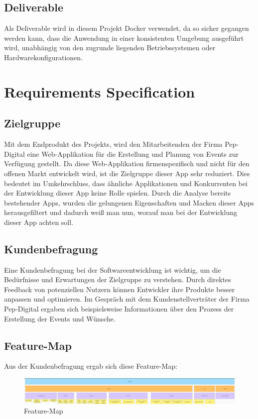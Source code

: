 \documentclass[a4paper,12pt]{article}
\begin{document}
\subsection{Deliverable}
Als Deliverable wird in diesem Projekt Docker verwendet, da so sicher gegangen werden kann, dass die Anwendung in einer konsistenten Umgebung ausgeführt wird, unabhängig von den zugrunde liegenden Betriebssystemen oder Hardwarekonfigurationen.
\newpage
\section{Requirements Specification}
\subsection{Zielgruppe}
Mit dem Endprodukt des Projekts, wird den Mitarbeitenden der Firma Pep-Digital eine Web-Applikation für die Erstellung und Planung von Events zur Verfügung gestellt. Da diese Web-Applikation firmenspezifisch und  nicht für den offenen Markt entwickelt wird, ist die Zielgruppe dieser App sehr reduziert. Dies bedeutet im Umkehrschluss, dass ähnliche Applikationen und Konkurrenten bei der Entwicklung dieser App keine Rolle spielen. Durch die Analyse bereits bestehender Apps, wurden die gelungenen Eigenschaften und Macken dieser Apps herausgefiltert und dadurch weiß man nun, worauf man bei der Entwicklung dieser App achten soll.
\subsection{Kundenbefragung}
Eine Kundenbefragung bei der Softwareentwicklung ist wichtig, um die Bedürfnisse und Erwartungen der Zielgruppe zu verstehen. Durch direktes Feedback von potenziellen Nutzern können Entwickler ihre Produkte besser anpassen und optimieren. Im Gespräch mit dem Kundenstellverträter der Firma Pep-Digital ergaben sich beispielsweise Informationen über den Prozess der Erstellung der Events und Wünsche.
\newpage
\subsection{Feature-Map}
Aus der Kundenbefragung ergab sich diese Feature-Map:
\begin{figure}[H]
    \centering
    \includegraphics[width=1\textwidth]{Abbildungen/feature_map.png}
    \caption{Feature-Map}
    \label{fig:feature_map}
\end{figure}
\end{document}
